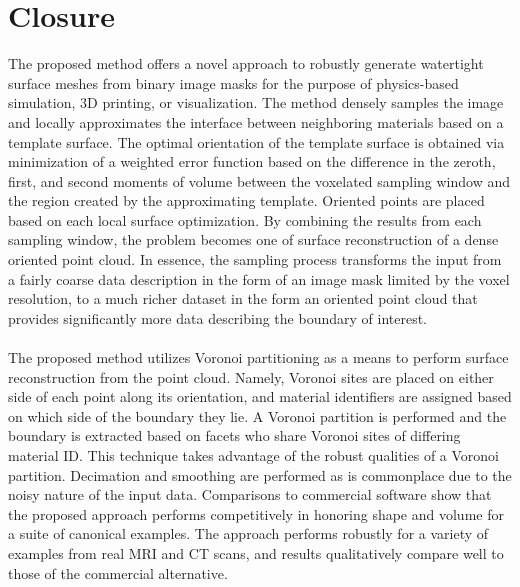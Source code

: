 \section{Closure}

The proposed method offers a novel approach to robustly generate watertight surface meshes from binary image masks for the purpose of physics-based simulation, 3D printing, or visualization. The method densely samples the image and locally approximates the interface between neighboring materials based on a template surface. The optimal orientation of the template surface is obtained via minimization of a weighted error function based on the difference in the zeroth, first, and second moments of volume between the voxelated sampling window and the region created by the approximating template. Oriented points are placed based on each local surface optimization. By combining the results from each sampling window, the problem becomes one of surface reconstruction of a dense oriented point cloud. In essence, the sampling process transforms the input from a fairly coarse data description in the form of an image mask limited by the voxel resolution, to a much richer dataset in the form an oriented point cloud that provides significantly more data describing the boundary of interest. \\ \\
%
The proposed method utilizes Voronoi partitioning as a means to perform surface reconstruction from the point cloud. Namely, Voronoi sites are placed on either side of each point along its orientation, and material identifiers are assigned based on which side of the boundary they lie. A Voronoi partition is performed and the boundary is extracted based on facets who share Voronoi sites of differing material ID. This technique takes advantage of the robust qualities of a Voronoi partition. Decimation and smoothing are performed as is commonplace due to the noisy nature of the input data. Comparisons to commercial software show that the proposed approach performs competitively in honoring shape and volume for a suite of canonical examples. The approach performs robustly for a variety of examples from real MRI and CT scans, and results qualitatively compare well to those of the commercial alternative. \\ \\
%
